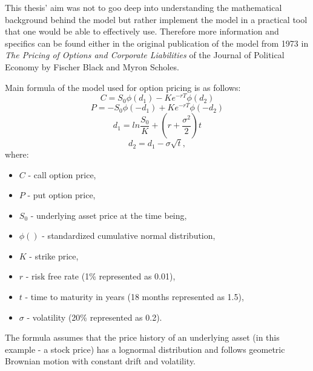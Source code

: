     This thesis' aim was not to goo deep into understanding the mathematical background behind the model but rather implement the model in a practical tool that one would be able to effectively use. Therefore more information and specifics can be found either in the original publication \cite{10.2307/1831029} of the model from 1973 in \textit{The Pricing of Options and Corporate Liabilities} of the Journal of Political Economy by Fischer Black and Myron Scholes.
    
    Main formula of the model used for option pricing is as follows:
    \[
    C = S_0\phi(d_1) - Ke^{-rT}\phi(d_2)
    \]
    \[
    P = -S_0\phi(-d_1) + Ke^{-rT}\phi(-d_2)
    \]
    \[
    d_1 = ln\frac{S_0}{K} + (r+\frac{\sigma^2}{2})t
    \]
    \[
    d_2 = d_1 - \sigma\sqrt{t},
    \]
    where:
    \begin{itemize}
        \item $C$ - call option price,
        \item $P$ - put option price,
        \item $S_0$ - underlying asset price at the time being,
        \item $\phi()$ - standardized cumulative normal distribution,
        \item $K$ - strike price,
        \item $r$ - risk free rate (1\% represented as 0.01),
        \item $t$ - time to maturity in years (18 months represented as 1.5),
        \item $\sigma$ - volatility (20\% represented as 0.2).
    \end{itemize}
    The formula assumes that the price history of an underlying asset (in this example - a stock price) has a lognormal distribution and follows geometric Brownian motion with constant drift and volatility. 
